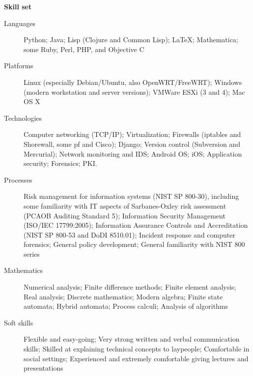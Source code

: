 \documentclass[letterpaper,11pt]{article}
\newcommand{\resheading}[1]{{\large \colorbox{mygrey}{\begin{minipage}
    {\textwidth}{\textbf{#1 \vphantom{p\^{E}}}}\end{minipage}}}}
\begin{document}
\resheading{Skill set}
\begin{description}
\item[Languages]
Python; Java; Lisp (Clojure and Common Lisp); \LaTeX; Mathematica; some Ruby, Perl, PHP, and Objective C
\item[Platforms]
Linux (especially Debian/Ubuntu, also OpenWRT/FreeWRT);
Windows (modern workstation and server versions);
VMWare ESXi (3 and 4); Mac OS X
\item[Technologies]
Computer networking (TCP/IP); Virtualization; Firewalls (iptables and Shorewall,
some pf and Cisco); Django; Version control (Subversion and Mercurial);
Network monitoring and IDS; Android OS; iOS; Application
security; Forensics; PKI.
\item[Processes]
Risk management for information systems (NIST SP 800-30),
including some familiarity with IT aspects of Sarbanes-Oxley risk assessment
(PCAOB Auditing Standard 5); Information Security Management (ISO/IEC 17799:2005);
Information Assurance Controls and Accreditation (NIST SP 800-53 and DoDI 8510.01);
Incident response and computer forensics; General policy development;
General familiarity with NIST 800 series
\item[Mathematics]
Numerical analysis; Finite difference methods; Finite element analysis;
Real analysis; Discrete mathematics; Modern algebra; Finite state automata;
Hybrid automata; Process calculi; Analysis of algorithms
\item[Soft skills]
Flexible and easy-going; Very strong written and verbal communication skills;
Skilled at explaining technical concepts to laypeople;
Comfortable in social settings; Experienced and extremely comfortable giving
lectures and presentations
\end{description}
\end{document}

